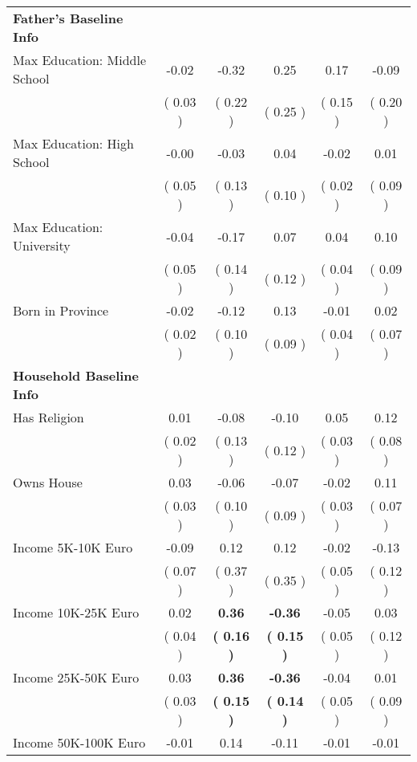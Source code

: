 \begin{table}[H]
{\begin{tabular}{lccccc}
\midrule
\textbf{Father's Baseline Info} \\
\quad Max Education: Middle School &     -0.02 &     -0.32 &      0.25 &      0.17 &     -0.09 \\
\quad  & (     0.03 ) & (     0.22 )  & (     0.25 )  & (     0.15 ) & (     0.20 ) \\
\quad Max Education: High School &     -0.00 &     -0.03 &      0.04 &     -0.02 &      0.01 \\
\quad  & (     0.05 ) & (     0.13 )  & (     0.10 )  & (     0.02 ) & (     0.09 ) \\
\quad Max Education: University &     -0.04 &     -0.17 &      0.07 &      0.04 &      0.10 \\
\quad  & (     0.05 ) & (     0.14 )  & (     0.12 )  & (     0.04 ) & (     0.09 ) \\
\quad Born in Province &     -0.02 &     -0.12 &      0.13 &     -0.01 &      0.02 \\
\quad  & (     0.02 ) & (     0.10 )  & (     0.09 )  & (     0.04 ) & (     0.07 ) \\
\midrule
\textbf{Household Baseline Info} \\
\quad Has Religion &      0.01 &     -0.08 &     -0.10 &      0.05 &      0.12 \\
\quad  & (     0.02 ) & (     0.13 )  & (     0.12 )  & (     0.03 ) & (     0.08 ) \\
\quad Owns House &      0.03 &     -0.06 &     -0.07 &     -0.02 &      0.11 \\
\quad  & (     0.03 ) & (     0.10 )  & (     0.09 )  & (     0.03 ) & (     0.07 ) \\
\quad Income 5K-10K Euro &     -0.09 &      0.12 &      0.12 &     -0.02 &     -0.13 \\
\quad  & (     0.07 ) & (     0.37 )  & (     0.35 )  & (     0.05 ) & (     0.12 ) \\
\quad Income 10K-25K Euro &      0.02 & \textbf{     0.36} & \textbf{    -0.36} &     -0.05 &      0.03 \\
\quad  & (     0.04 ) & \textbf{(     0.16 )}  & \textbf{(     0.15 )}  & (     0.05 ) & (     0.12 ) \\
\quad Income 25K-50K Euro &      0.03 & \textbf{     0.36} & \textbf{    -0.36} &     -0.04 &      0.01 \\
\quad  & (     0.03 ) & \textbf{(     0.15 )}  & \textbf{(     0.14 )}  & (     0.05 ) & (     0.09 ) \\
\quad Income 50K-100K Euro &     -0.01 &      0.14 &     -0.11 &     -0.01 &     -0.01 \\

\end{tabular}}
\end{table}
